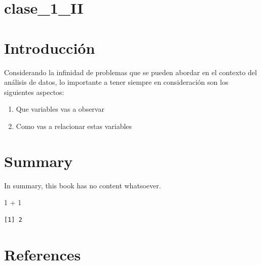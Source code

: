 \documentclass[
  letterpaper,
  DIV=11,
  numbers=noendperiod]{scrreprt}
\newenvironment{Shaded}{\begin{snugshade}}{\end{snugshade}}
\newcommand{\DecValTok}[1]{\textcolor[rgb]{0.68,0.00,0.00}{#1}}
\newcommand{\SpecialCharTok}[1]{\textcolor[rgb]{0.37,0.37,0.37}{#1}}
\providecommand{\tightlist}{%
  \setlength{\itemsep}{0pt}\setlength{\parskip}{0pt}}
\begin{document}

\chapter{clase\_1\_II}\label{clase_1_ii}


\chapter{Introducción}\label{introducciuxf3n}

Considerando la infinidad de problemas que se pueden abordar en el
contexto del análisis de datos, lo importante a tener siempre en
consideración son los siguientes aspectos:

\begin{enumerate}
\def\labelenumi{\arabic{enumi}.}
\tightlist
\item
  Que variables vas a observar
\item
  Como vas a relacionar estas variables
\end{enumerate}


\chapter{Summary}\label{summary}

In summary, this book has no content whatsoever.

\begin{Shaded}
\begin{Highlighting}[]
\DecValTok{1} \SpecialCharTok{+} \DecValTok{1}
\end{Highlighting}
\end{Shaded}

\begin{verbatim}
[1] 2
\end{verbatim}


\chapter*{References}\label{references}


\protect{}\label{refs}
\end{document}

